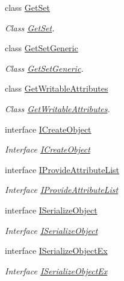 \begin{DoxyCompactItemize}
class \hyperlink{class_serialization_1_1_get_set}{Get\+Set}
\begin{DoxyCompactList}\small\item\em Class \hyperlink{class_serialization_1_1_get_set}{Get\+Set}. \end{DoxyCompactList}\item 
class \hyperlink{class_serialization_1_1_get_set_generic}{Get\+Set\+Generic}
\begin{DoxyCompactList}\small\item\em Class \hyperlink{class_serialization_1_1_get_set_generic}{Get\+Set\+Generic}. \end{DoxyCompactList}\item 
class \hyperlink{class_serialization_1_1_get_writable_attributes}{Get\+Writable\+Attributes}
\begin{DoxyCompactList}\small\item\em Class \hyperlink{class_serialization_1_1_get_writable_attributes}{Get\+Writable\+Attributes}. \end{DoxyCompactList}\item 
interface \hyperlink{interface_serialization_1_1_i_create_object}{I\+Create\+Object}
\begin{DoxyCompactList}\small\item\em Interface \hyperlink{interface_serialization_1_1_i_create_object}{I\+Create\+Object} \end{DoxyCompactList}\item 
interface \hyperlink{interface_serialization_1_1_i_provide_attribute_list}{I\+Provide\+Attribute\+List}
\begin{DoxyCompactList}\small\item\em Interface \hyperlink{interface_serialization_1_1_i_provide_attribute_list}{I\+Provide\+Attribute\+List} \end{DoxyCompactList}\item 
interface \hyperlink{interface_serialization_1_1_i_serialize_object}{I\+Serialize\+Object}
\begin{DoxyCompactList}\small\item\em Interface \hyperlink{interface_serialization_1_1_i_serialize_object}{I\+Serialize\+Object} \end{DoxyCompactList}\item 
interface \hyperlink{interface_serialization_1_1_i_serialize_object_ex}{I\+Serialize\+Object\+Ex}
\begin{DoxyCompactList}\small\item\em Interface \hyperlink{interface_serialization_1_1_i_serialize_object_ex}{I\+Serialize\+Object\+Ex} \end{DoxyCompactList}\item 

\end{DoxyCompactItemize}
